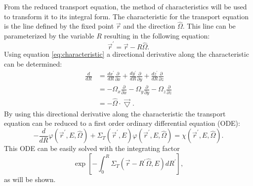From the reduced transport equation, the method of characteristics will be 
used to transform it to its integral form. The characteristic for the transport 
equation is the line defined by the fixed point $\vec{r}$ and the direction 
$\hat{\Omega}$. This line can be parameterized by the variable $R$ resulting in 
the following equation:
\begin{equation}
  \vec{r}^{'} = \vec{r} - R\hat{\Omega}.
  \label{eq:characteristic}
\end{equation}
Using equation \ref{eq:characteristic} a directional derivative along the
characteristic can be determined:
\begin{align}
  \frac{d}{dR} & = \frac{dx^{'}}{dR}\frac{\partial}{\partial x} +
  \frac{dy^{'}}{dR}\frac{\partial}{\partial y} +
  \frac{dz^{'}}{dR}\frac{\partial}{\partial z} \nonumber \\
  & = -\Omega_x \frac{\partial}{\partial x} -
  \Omega_y \frac{\partial}{\partial y} -
  \Omega_z \frac{\partial}{\partial z} \nonumber \\
  & = -\hat{\Omega} \cdot \vec{\bigtriangledown}.
\end{align}
By using this directional derivative along the characteristic the transport 
equation can be reduced to a first order ordinary differential equation (ODE):
\begin{equation}
  -\frac{d}{dR}\varphi(\vec{r}^{'},E,\hat{\Omega}) + \Sigma_T(\vec{r}^{'},E)
  \varphi(\vec{r}^{'},E,\hat{\Omega}) =
  \chi(\vec{r}^{'},E,\hat{\Omega}).
  \label{eq:transport_ode}
\end{equation}
This ODE can be easily solved with the integrating factor
\begin{equation*}
\exp{\left[-\int_0^R \Sigma_T(\vec{r}-R^{'}\hat{\Omega},E)dR^{'} \right]},
\end{equation*}
as will be shown. 

